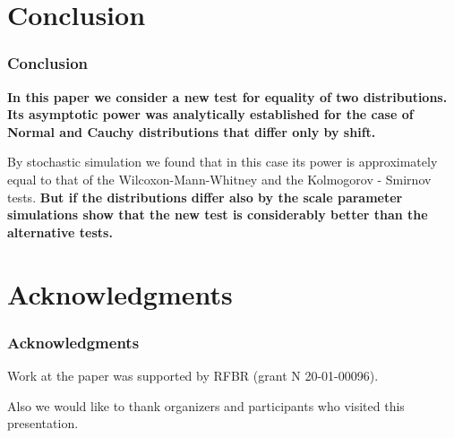 \documentclass[slidestop,usepdftitle=false]{beamer}
\begin{document}
\section{Conclusion}
\begin{slide}
\frametitle{Conclusion}
{\bf In this paper we consider a new test for equality of two distributions. Its asymptotic power was analytically established for the case of  Normal and Cauchy distributions that differ only by shift.}

\bigskip
By stochastic simulation we found that in this case its power is approximately equal to that of the Wilcoxon-Mann-Whitney and the
Kolmogorov - Smirnov tests. {\bf But if the distributions differ also by the scale parameter simulations show that the new test is considerably better than the alternative tests.}
\end{slide}
\section{Acknowledgments}
\begin{slide}
\frametitle{Acknowledgments}
\bigskip
\bigskip
 Work at the paper was supported by RFBR (grant N 20-01-00096).
 \bigskip

 Also we would like to thank organizers and participants who visited this presentation.
\end{slide}
\end{document}

